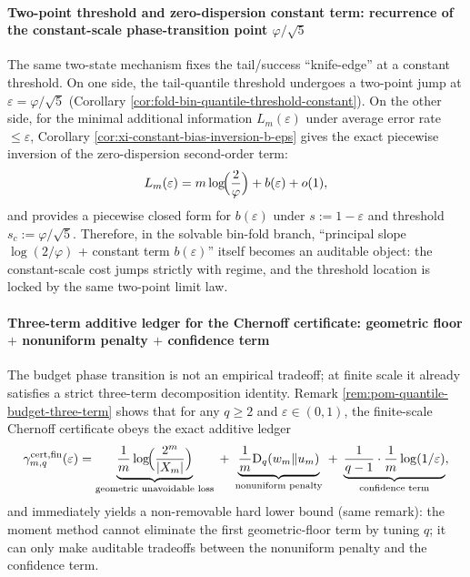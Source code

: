 \paragraph{Two-point threshold and zero-dispersion constant term: recurrence of the constant-scale phase-transition point \texorpdfstring{$\varphi/\sqrt5$}{phi/sqrt5}}
The same two-state mechanism fixes the tail/success ``knife-edge'' at a constant threshold.
On one side, the tail-quantile threshold undergoes a two-point jump at \(\varepsilon=\varphi/\sqrt5\) (Corollary \ref{cor:fold-bin-quantile-threshold-constant}).
On the other side, for the minimal additional information \(L_m(\varepsilon)\) under average error rate \(\le\varepsilon\), Corollary \ref{cor:xi-constant-bias-inversion-b-eps} gives the exact piecewise inversion of the zero-dispersion second-order term:
\[
L_m(\varepsilon)=m\log\!\Bigl(\frac{2}{\varphi}\Bigr)+b(\varepsilon)+o(1),
\]
and provides a piecewise closed form for \(b(\varepsilon)\) under \(s:=1-\varepsilon\) and threshold \(s_c:=\varphi/\sqrt5\).
Therefore, in the solvable bin-fold branch, ``principal slope \(\log(2/\varphi)\) + constant term \(b(\varepsilon)\)'' itself becomes an auditable object: the constant-scale cost jumps strictly with regime, and the threshold location is locked by the same two-point limit law.

\paragraph{Three-term additive ledger for the Chernoff certificate: geometric floor \texorpdfstring{$+$}{+} nonuniform penalty \texorpdfstring{$+$}{+} confidence term}
The budget phase transition is not an empirical tradeoff; at finite scale it already satisfies a strict three-term decomposition identity.
Remark \ref{rem:pom-quantile-budget-three-term} shows that for any \(q\ge 2\) and \(\varepsilon\in(0,1)\), the finite-scale Chernoff certificate obeys the exact additive ledger
\[
\gamma^{\mathrm{cert,fin}}_{m,q}(\varepsilon)
=
\underbrace{\frac{1}{m}\log\!\Bigl(\frac{2^m}{|X_m|}\Bigr)}_{\text{geometric unavoidable loss}}
\;+\;
\underbrace{\frac{1}{m}\mathrm{D}_q(w_m\Vert u_m)}_{\text{nonuniform penalty}}
\;+\;
\underbrace{\frac{1}{q-1}\cdot\frac{1}{m}\log(1/\varepsilon)}_{\text{confidence term}},
\]
and immediately yields a non-removable hard lower bound (same remark): the moment method cannot eliminate the first geometric-floor term by tuning \(q\); it can only make auditable tradeoffs between the nonuniform penalty and the confidence term.

